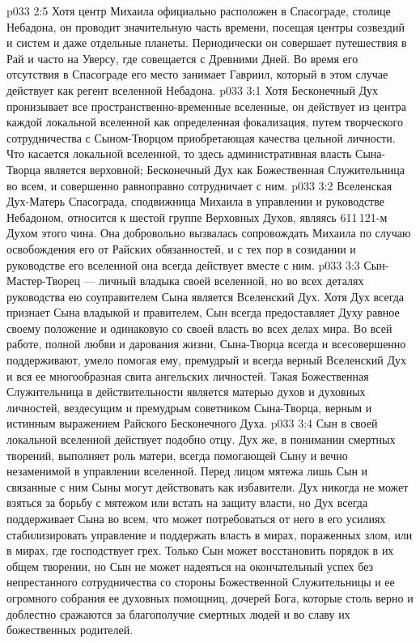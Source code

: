 \vs p033 2:5 \pc Хотя центр Михаила официально расположен в Спасограде, столице Небадона, он проводит значительную часть времени, посещая центры созвездий и систем и даже отдельные планеты. Периодически он совершает путешествия в Рай и часто на Уверсу, где совещается с Древними Дней. Во время его отсутствия в Спасограде его место занимает Гавриил, который в этом случае действует как регент вселенной Небадона.
\vs p033 3:1 Хотя Бесконечный Дух пронизывает все пространственно\hyp{}временные вселенные, он действует из центра каждой локальной вселенной как определенная фокализация, путем творческого сотрудничества с Сыном\hyp{}Творцом приобретающая качества цельной личности. Что касается локальной вселенной, то здесь административная власть Сына\hyp{}Творца является верховной; Бесконечный Дух как Божественная Служительница во всем, и совершенно равноправно сотрудничает с ним.
\vs p033 3:2 \pc Вселенская Дух\hyp{}Матерь Спасограда, сподвижница Михаила в управлении и руководстве Небадоном, относится к шестой группе Верховных Духов, являясь 611\,121\hyp{}м Духом этого чина. Она добровольно вызвалась сопровождать Михаила по случаю освобождения его от Райских обязанностей, и с тех пор в созидании и руководстве его вселенной она всегда действует вместе с ним.
\vs p033 3:3 \pc Сын\hyp{}Мастер\hyp{}Творец --- личный владыка своей вселенной, но во всех деталях руководства ею соуправителем Сына является Вселенский Дух. Хотя Дух всегда признает Сына владыкой и правителем, Сын всегда предоставляет Духу равное своему положение и одинаковую со своей власть во всех делах мира. Во всей работе, полной любви и дарования жизни, Сына\hyp{}Творца всегда и всесовершенно поддерживают, умело помогая ему, премудрый и всегда верный Вселенский Дух и вся ее многообразная свита ангельских личностей. Такая Божественная Служительница в действительности является матерью духов и духовных личностей, вездесущим и премудрым советником Сына\hyp{}Творца, верным и истинным выражением Райского Бесконечного Духа.
\vs p033 3:4 \pc Сын в своей локальной вселенной действует подобно отцу. Дух же, в понимании смертных творений, выполняет роль матери, всегда помогающей Сыну и вечно незаменимой в управлении вселенной. Перед лицом мятежа лишь Сын и связанные с ним Сыны могут действовать как избавители. Дух никогда не может взяться за борьбу с мятежом или встать на защиту власти, но Дух всегда поддерживает Сына во всем, что может потребоваться от него в его усилиях стабилизировать управление и поддержать власть в мирах, пораженных злом, или в мирах, где господствует грех. Только Сын может восстановить порядок в их общем творении, но Сын не может надеяться на окончательный успех без непрестанного сотрудничества со стороны Божественной Служительницы и ее огромного собрания ее духовных помощниц, дочерей Бога, которые столь верно и доблестно сражаются за благополучие смертных людей и во славу их божественных родителей.
